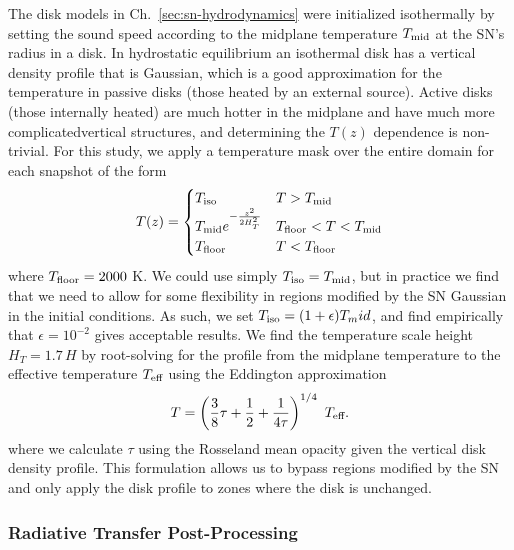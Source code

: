 The disk models in Ch.~\ref{sec:sn-hydrodynamics} were initialized isothermally by setting the sound speed according to the midplane temperature $T_\text{mid}$ at the SN's radius in a \citet{SirkoGoodman03} disk.
In hydrostatic equilibrium an isothermal disk has a vertical density profile that is Gaussian, which is a good approximation for the temperature in passive disks (those heated by an external source).
Active disks (those internally heated) are much hotter in the midplane and have much more complicatedvertical structures, and determining the $T(z)$ dependence is non-trivial.
For this study, we apply a temperature mask over the entire domain for each snapshot of the form
\begin{equation}
\label{eqn:temp-profile}
    T(z) =
    \begin{cases}
	T_\text{iso} & T>T_\text{mid} \\
	T_\text{mid} e^{- \frac{z^2}{2 H_T^2}} & T_\text{floor} < T < T_\text{mid} \\
	T_\text{floor} & T<T_\text{floor}
    \end{cases}
\end{equation}
where $T_\text{floor}=2000$ K.
We could use simply $T_\text{iso} = T_\text{mid}$, but in practice we find that we need to allow for some flexibility in regions modified by the SN Gaussian in the initial conditions.
As such, we set $T_\text{iso} = (1+\epsilon) T_mid$, and find empirically that $\epsilon=10^{-2}$ gives acceptable results.
We find the temperature scale height $H_T=1.7\,H$ by root-solving for the profile from the midplane temperature to the effective temperature $T_\text{eff}$ using the Eddington approximation
\begin{equation}
	T = \left( \frac{3}{8} \tau + \frac{1}{2} + \frac{1}{4\tau} \right)^{1/4}\ \Teff.
\end{equation}
where we calculate $\tau$ using the Rosseland mean opacity given the vertical disk density profile.
This formulation allows us to bypass regions modified by the SN and only apply the disk profile to zones where the disk is unchanged.



%
%
\subsubsection{Radiative Transfer Post-Processing} \label{subsec:rad-transfer}


